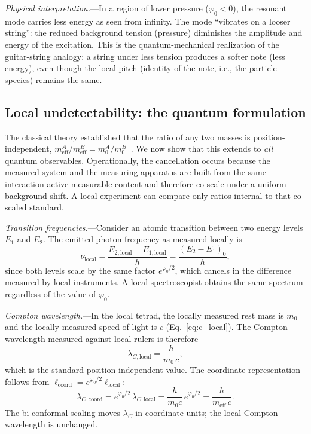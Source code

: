 \documentclass[aps,prd,onecolumn,superscriptaddress,nofootinbib,showpacs,12pt,notitlepage]{revtex4-2}
\newcommand{\meff}{m_{\mathrm{eff}}}
\begin{document}
\textit{Physical interpretation.}---In a region of lower
pressure ($\varphi_0 < 0$), the resonant mode carries
less energy as seen from infinity.  The mode ``vibrates
on a looser string'': the reduced background tension
(pressure) diminishes the amplitude and energy of the
excitation.  This is the quantum-mechanical realization
of the guitar-string analogy: a string under less tension
produces a softer note (less energy), even though the
local pitch (identity of the note, i.e., the particle
species) remains the same.

\subsection{Local undetectability: the quantum formulation}
\label{sec:local_undet}

The classical theory established that the ratio of any
two masses is position-independent,
$\meff^A/\meff^B = m_0^A/m_0^B$~\cite{Lotishvili2026}.
We now show that this extends to \emph{all} quantum
observables.
Operationally, the cancellation occurs because the measured system and the
measuring apparatus are built from the same interaction-active measurable
content and therefore co-scale under a uniform background shift.  A local
experiment can compare only ratios internal to that co-scaled standard.

\textit{Transition frequencies.}---Consider an atomic
transition between two energy levels $E_1$ and $E_2$.
The emitted photon frequency as measured locally is
\begin{equation}
  \nu_{\mathrm{local}}
  = \frac{E_{2,\mathrm{local}} - E_{1,\mathrm{local}}}{h}
  = \frac{(E_2 - E_1)_0}{h},
\end{equation}
since both levels scale by the same factor
$e^{\varphi_0/2}$, which cancels in the difference
measured by local instruments.  A local spectroscopist
obtains the same spectrum regardless of the value
of $\varphi_0$.

\textit{Compton wavelength.}---In the local tetrad,
the locally measured rest mass is $m_{0}$ and the
locally measured speed of light is $c$
(Eq.~\ref{eq:c_local}).  The Compton wavelength
measured against local rulers is therefore
\begin{equation}
  \lambda_{C,\mathrm{local}}
  = \frac{h}{m_{0}\,c},
\end{equation}
which is the standard position-independent value.
The coordinate representation follows from
$\ell_{\mathrm{coord}}=e^{\varphi_0/2}
\ell_{\mathrm{local}}$:
\begin{equation}
  \lambda_{C,\mathrm{coord}}
  = e^{\varphi_0/2}\,\lambda_{C,\mathrm{local}}
  = \frac{h}{m_{0}c}\,e^{\varphi_0/2}
  = \frac{h}{\meff\,c}.
\end{equation}
The bi-conformal scaling moves $\lambda_C$ in coordinate
units; the local Compton wavelength is unchanged.
\end{document}
